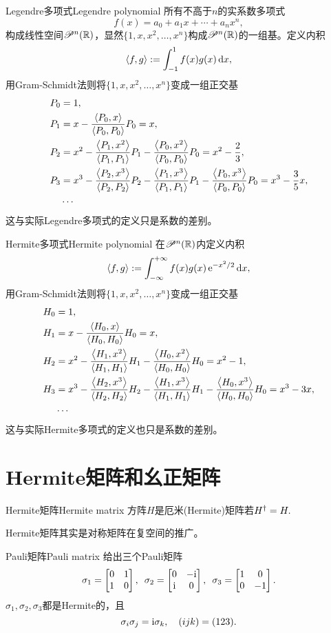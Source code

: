\begin{example}{Legendre多项式}{Legendre polynomial}
	所有不高于$n$的实系数多项式
	\[
		f(x)=a_0+a_1x+\cdots+a_nx^n,
	\]
	构成线性空间$\mathscr P^n(\mathbb R)$，显然$\{1,x,x^2,\ldots,x^n\}$构成$\mathscr P^n(\mathbb R)$的一组基。定义内积
	\[
		\left\langle f,g\right\rangle:=\int_{-1}^1f(x)g(x)\mathop{}\!\mathrm{d} x,
	\]
	用Gram-Schmidt法则将$\{1,x,x^2,\ldots,x^n\}$变成一组正交基%
	\begin{align*}
		P_0&=1,\\
		P_1&=x-\frac{\left\langle P_0,x\right\rangle}{\left\langle P_0,P_0\right\rangle}P_0=x,\\
		P_2&=x^2-\frac{\left\langle P_1,x^2\right\rangle}{\left\langle P_1,P_1\right\rangle}P_1-\frac{\left\langle P_0,x^2\right\rangle}{\left\langle P_0,P_0\right\rangle}P_0=x^2-\frac23,\\
		P_3&=x^3-\frac{\left\langle P_2,x^3\right\rangle}{\left\langle P_2,P_2\right\rangle}P_2-\frac{\left\langle P_1,x^3\right\rangle}{\left\langle P_1,P_1\right\rangle}P_1-\frac{\left\langle P_0,x^3\right\rangle}{\left\langle P_0,P_0\right\rangle}P_0=x^3-\frac35x,\\
		&\cdots
	\end{align*}
	这与实际Legendre多项式的定义只是系数的差别。
\end{example}
\begin{example}{Hermite多项式}{Hermite polynomial}
	在$\mathscr P^n(\mathbb R)$内定义内积
	\[
		\left\langle f,g\right\rangle:=\int_{-\infty}^{+\infty} f(x)g(x)\mathop{}\!\mathrm{e}^{-x^2/2}\mathop{}\!\mathrm{d} x,
	\]
	用Gram-Schmidt法则将$\{1,x,x^2,\ldots,x^n\}$变成一组正交基
	\begin{align*}
		H_0&=1,\\
		H_1&=x-\frac{\left\langle H_0,x\right\rangle}{\left\langle H_0,H_0\right\rangle}H_0=x,\\
		H_2&=x^2-\frac{\left\langle H_1,x^2\right\rangle}{\left\langle H_1,H_1\right\rangle}H_1-\frac{\left\langle H_0,x^2\right\rangle}{\left\langle H_0,H_0\right\rangle}H_0=x^2-1,\\
		H_3&=x^3-\frac{\left\langle H_2,x^3\right\rangle}{\left\langle H_2,H_2\right\rangle}H_2-\frac{\left\langle H_1,x^3\right\rangle}{\left\langle H_1,H_1\right\rangle}H_1-\frac{\left\langle H_0,x^3\right\rangle}{\left\langle H_0,H_0\right\rangle}H_0=x^3-3x,\\
		&\cdots
	\end{align*}
	这与实际Hermite多项式的定义也只是系数的差别。
\end{example}
\section{Hermite矩阵和幺正矩阵}
\begin{definition}{Hermite矩阵}{Hermite matrix}
	方阵$H$是厄米(Hermite)矩阵若$H^\dagger=H.$
\end{definition}
Hermite矩阵其实是对称矩阵在复空间的推广。

\begin{example}{Pauli矩阵}{Pauli matrix}
	给出三个Pauli矩阵
	\[
		\sigma_1=
		\begin{bmatrix}
			0&1\\1&0
		\end{bmatrix},\enspace
		\sigma_2=
		\begin{bmatrix}
			0&-\mathrm{i}\\\mathrm{i}&0
		\end{bmatrix},\enspace
		\sigma_3=
		\begin{bmatrix}
			1&0\\0&-1
		\end{bmatrix}.
	\]
	$\sigma_1,\sigma_2,\sigma_3$都是Hermite的，且
	\[
		\sigma_i\sigma_j=\mathrm{i}\sigma_k,\quad(ijk)=(123).
	\]
\end{example}

